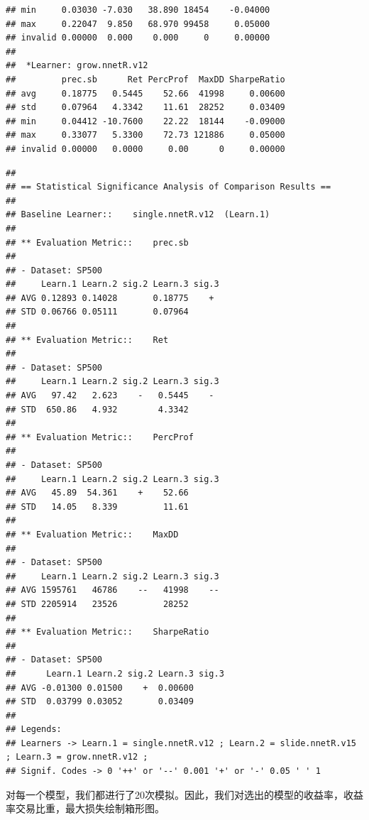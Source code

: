 \documentclass{article}\usepackage[]{graphicx}\usepackage[]{color}
\makeatletter
\newenvironment{kframe}{%
 \def\at@end@of@kframe{}%
 \ifinner\ifhmode%
  \def\at@end@of@kframe{\end{minipage}}%
  \begin{minipage}{\columnwidth}%
 \fi\fi%
 \def\FrameCommand##1{\hskip\@totalleftmargin \hskip-\fboxsep
 \colorbox{shadecolor}{##1}\hskip-\fboxsep
     \hskip-\linewidth \hskip-\@totalleftmargin \hskip\columnwidth}%
 \MakeFramed {\advance\hsize-\width
   \@totalleftmargin\z@ \linewidth\hsize
   \@setminipage}}%
 {\par\unskip\endMakeFramed%
 \at@end@of@kframe}
\newenvironment{knitrout}{}{} %
\makeatother
\begin{document}
\begin{CJK*}{UTF8}{gkai}
\begin{knitrout}
\begin{kframe}
\begin{verbatim}
## min     0.03030 -7.030   38.890 18454    -0.04000
## max     0.22047  9.850   68.970 99458     0.05000
## invalid 0.00000  0.000    0.000     0     0.00000
## 
## 	*Learner: grow.nnetR.v12 
##         prec.sb      Ret PercProf  MaxDD SharpeRatio
## avg     0.18775   0.5445    52.66  41998     0.00600
## std     0.07964   4.3342    11.61  28252     0.03409
## min     0.04412 -10.7600    22.22  18144    -0.09000
## max     0.33077   5.3300    72.73 121886     0.05000
## invalid 0.00000   0.0000     0.00      0     0.00000
\end{verbatim}
\end{kframe}
\end{knitrout}

\begin{knitrout}
\color{fgcolor}\begin{kframe}
\begin{verbatim}
## 
## == Statistical Significance Analysis of Comparison Results ==
## 
## Baseline Learner::	 single.nnetR.v12  (Learn.1)
## 
## ** Evaluation Metric::	 prec.sb 
## 
## - Dataset: SP500 
##     Learn.1 Learn.2 sig.2 Learn.3 sig.3
## AVG 0.12893 0.14028       0.18775    + 
## STD 0.06766 0.05111       0.07964      
## 
## ** Evaluation Metric::	 Ret 
## 
## - Dataset: SP500 
##     Learn.1 Learn.2 sig.2 Learn.3 sig.3
## AVG   97.42   2.623    -   0.5445    - 
## STD  650.86   4.932        4.3342      
## 
## ** Evaluation Metric::	 PercProf 
## 
## - Dataset: SP500 
##     Learn.1 Learn.2 sig.2 Learn.3 sig.3
## AVG   45.89  54.361    +    52.66      
## STD   14.05   8.339         11.61      
## 
## ** Evaluation Metric::	 MaxDD 
## 
## - Dataset: SP500 
##     Learn.1 Learn.2 sig.2 Learn.3 sig.3
## AVG 1595761   46786    --   41998    --
## STD 2205914   23526         28252      
## 
## ** Evaluation Metric::	 SharpeRatio 
## 
## - Dataset: SP500 
##      Learn.1 Learn.2 sig.2 Learn.3 sig.3
## AVG -0.01300 0.01500    +  0.00600      
## STD  0.03799 0.03052       0.03409      
## 
## Legends:
## Learners -> Learn.1 = single.nnetR.v12 ; Learn.2 = slide.nnetR.v15 ; Learn.3 = grow.nnetR.v12 ; 
## Signif. Codes -> 0 '++' or '--' 0.001 '+' or '-' 0.05 ' ' 1
\end{verbatim}
\end{kframe}
\end{knitrout}

对每一个模型，我们都进行了20次模拟。因此，我们对选出的模型的收益率，收益率交易比重，最大损失绘制箱形图。

\begin{knitrout}
\color{fgcolor}


\end{knitrout}
\end{CJK*}
\end{document}
